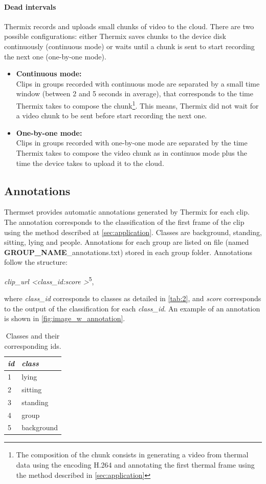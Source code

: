 \documentclass[oneside, twocolumn]{article}
\begin{document}
\paragraph{Dead intervals}
\label{par:time-gap}
Thermix records and uploads small chunks of video to the cloud. There are two possible configurations: either
Thermix saves chunks to the device disk continuously (continuous mode) or waits until a chunk is sent to start
recording the next one (one-by-one mode).
\begin{itemize}
	\item \textbf{Continuous mode:}\\
		Clips in groups recorded with continuous mode are separated by a small time window (between 2 and 5 seconds in average),
    that corresponds to the time Thermix takes to compose the chunk\footnote{The composition of the chunk consists
    in generating a video from thermal data using the encoding H.264 and annotating the first thermal frame using the method described
    in \autoref{sec:application}}. This means, Thermix did not wait for a video chunk to be sent before start
    recording the next one.\\
	\item \textbf{One-by-one mode:}\\
		Clips in groups recorded with one-by-one mode are separated by the time Thermix takes to compose the video
    chunk as in continuos mode plus the time the device takes to upload it to the cloud.
\end{itemize}

\subsection{Annotations}
\label{subsec:annotations}
Thermset provides automatic annotations generated by Thermix for each clip. The annotation corresponds to the
classification of the first frame of the clip using the method described at \autoref{sec:application}.
Classes are background, standing, sitting, lying and people. Annotations for each group are listed on file
(named \textbf{GROUP\_NAME}\_annotations.txt) stored in each group folder. Annotations follow the structure:

	\textit{clip\_url \textbraceleft \textless class\_id:score \textgreater}\textbraceright \textsuperscript{5},

	where \textit{class\_id} corresponds to classes as detailed in \autoref{tab:2}, and \textit{score} corresponds to
  the output of the classification for each \textit{class\_id}.
  An example of an annotation is shown in \autoref{fig:image_w_annotation}.
\begin{table}
\center
	\begin{tabular}{l | l}
\textit{id} & \textit{class} \\
\hline
1 & lying \\
2 & sitting \\
3 & standing \\
4 & group \\
5 & background \\
\end{tabular}
  \caption{Classes and their corresponding ids.}
  \label{tab:2}
\end{table}
\end{document}

